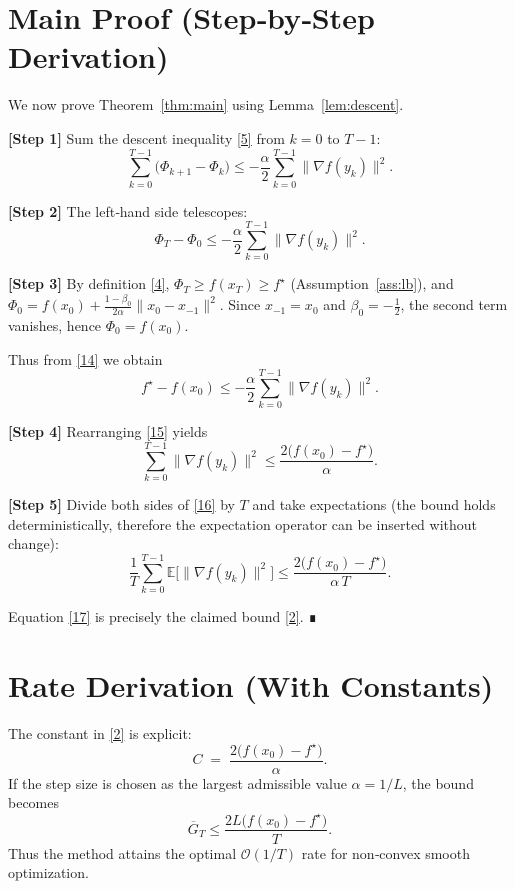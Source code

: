\documentclass{article}
\begin{document}
\section*{Main Proof (Step‑by‑Step Derivation)}
We now prove Theorem~\ref{thm:main} using Lemma~\ref{lem:descent}.

\textbf{[Step 1]} Sum the descent inequality \eqref{5} from \(k=0\) to
\(T-1\):
\[
\sum_{k=0}^{T-1}\bigl(\Phi_{k+1}-\Phi_k\bigr)
\le -\frac{\alpha}{2}\sum_{k=0}^{T-1}\|\nabla f(y_k)\|^{2}.
\tag{13}
\]

\textbf{[Step 2]} The left‑hand side telescopes:
\[
\Phi_T-\Phi_0\le -\frac{\alpha}{2}\sum_{k=0}^{T-1}\|\nabla f(y_k)\|^{2}.
\tag{14}
\]

\textbf{[Step 3]} By definition \eqref{4},
\(\Phi_T\ge f(x_T)\ge f^\star\) (Assumption~\ref{ass:lb}), and
\(\Phi_0 = f(x_0) + \frac{1-\beta_0}{2\alpha}\|x_0-x_{-1}\|^{2}\).
Since \(x_{-1}=x_0\) and \(\beta_0=-\tfrac12\), the second term vanishes,
hence \(\Phi_0 = f(x_0)\).

Thus from \eqref{14} we obtain
\[
f^\star - f(x_0) \le -\frac{\alpha}{2}\sum_{k=0}^{T-1}
\|\nabla f(y_k)\|^{2}.
\tag{15}
\]

\textbf{[Step 4]} Rearranging \eqref{15} yields
\[
\sum_{k=0}^{T-1}\|\nabla f(y_k)\|^{2}
\le \frac{2\bigl(f(x_0)-f^\star\bigr)}{\alpha}.
\tag{16}
\]

\textbf{[Step 5]} Divide both sides of \eqref{16} by \(T\) and take
expectations (the bound holds deterministically, therefore the
expectation operator can be inserted without change):
\[
\frac{1}{T}\sum_{k=0}^{T-1}
\mathbb{E}\bigl[\|\nabla f(y_k)\|^{2}\bigr]
\le \frac{2\bigl(f(x_0)-f^\star\bigr)}{\alpha\,T}.
\tag{17}
\]

Equation \eqref{17} is precisely the claimed bound \eqref{2}. ∎

\section*{Rate Derivation (With Constants)}
The constant in \eqref{2} is explicit:
\[
C \;=\; \frac{2\bigl(f(x_0)-f^\star\bigr)}{\alpha}.
\]
If the step size is chosen as the largest admissible value
\(\alpha=1/L\), the bound becomes
\[
\overline{G}_T \le \frac{2L\bigl(f(x_0)-f^\star\bigr)}{T}.
\tag{18}
\]
Thus the method attains the optimal \(\mathcal{O}(1/T)\) rate for
non‑convex smooth optimization.
\end{document}
